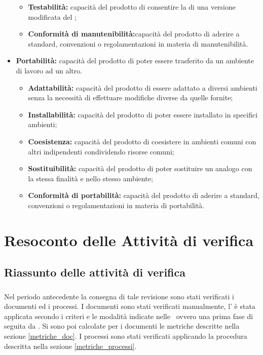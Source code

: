 \documentclass[12pt,a4paper]{article}
\begin{document}
\begin{itemize}
\begin{itemize}
		\item \textbf{Testabilità:} capacità del prodotto   di consentire la   di una versione modificata del  ;
		\item \textbf{Conformità di manutenibilità:}capacità del prodotto   di aderire a standard, convenzioni o regolamentazioni in materia di manutenibilità.
	\end{itemize}
	\item \textbf{Portabilità:} capacità del prodotto   di poter essere trasferito da un ambiente di lavoro ad un altro.
	\begin{itemize}
		\item \textbf{Adattabilità:} capacità del prodotto   di essere adattato a diversi ambienti senza la necessità di effettuare modifiche diverse da quelle fornite;
		\item \textbf{Installabilità: }capacità del prodotto   di poter essere installato in specifici ambienti;
		\item \textbf{Coesistenza: }capacità del prodotto   di coesistere in ambienti comuni con altri   indipendenti condividendo risorse comuni;
		\item \textbf{Sostituibilità:} capacità del prodotto   di poter sostituire un   analogo con la stessa finalità e nello stesso ambiente;
		\item \textbf{ Conformità di portabilità:} capacità del prodotto   di aderire a standard, convenzioni o regolamentazioni in materia di portabilità.
	\end{itemize}
\end{itemize}

\newpage
\appendix
\section{Resoconto delle Attività di verifica} \label{Resoconto delle attività di verifica}
\subsection{Riassunto delle \textbf{attività} di verifica} 
\subsubsection{\RR}
Nel periodo antecedente la consegna di tale revisione sono stati verificati i documenti ed i processi.
I documenti sono stati verificati manualmente, l'  è stata applicata secondo i criteri e le modalità indicate nelle \NdP\, ovvero una prima fase di  seguita da .
Si sono poi calcolate per i documenti le metriche descritte nella sezione \ref{metriche_doc}.
I processi sono stati verificati applicando la procedura descritta nella sezione \ref{metriche_processi}.
\end{document}
